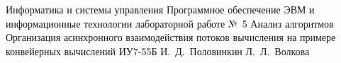 \makereporttitle
{Информатика и системы управления} %
{Программное обеспечение ЭВМ и информационные технологии} %
{лабораторной работе №~5} %
{Анализ алгоритмов} %
{Организация асинхронного взаимодействия потоков вычисления на примере конвейерных вычислений} %
{}
{ИУ7-55Б}
{И.~Д.~Половинкин} %
{Л.~Л.~Волкова}
